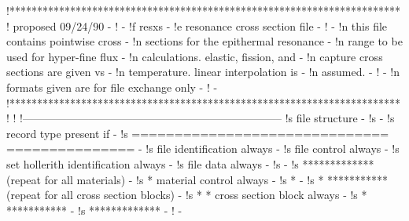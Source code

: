 \small
\begin{ccode}

!***********************************************************************
!               proposed 09/24/90                                      -
!                                                                      -
!f           resxs                                                     -
!e           resonance cross section file                              -
!                                                                      -
!n                       this file contains pointwise cross            -
!n                       sections for the epithermal resonance         -
!n                       range to be used for hyper-fine flux          -
!n                       calculations.  elastic, fission, and          -
!n                       capture cross sections are given vs           -
!n                       temperature.  linear interpolation is         -
!n                       assumed.                                      -
!                                                                      -
!n           formats given are for file exchange only                  -
!                                                                      -
!***********************************************************************
!
!
!-----------------------------------------------------------------------
!s          file structure                                             -
!s                                                                     -
!s              record type                       present if           -
!s              ==============================    ===============      -
!s              file identification                 always             -
!s              file control                        always             -
!s              set hollerith identification        always             -
!s              file data                           always             -
!s                                                                     -
!s   *************(repeat for all materials)                           -
!s   *          material control                    always             -
!s   *                                                                 -
!s   * ***********(repeat for all cross section blocks)                -
!s   * *        cross section block                 always             -
!s   * ***********                                                     -
!s   *************                                                     -
!                                                                      -

\end{ccode}
